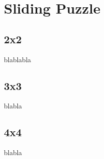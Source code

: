 
\chapter{Sliding Puzzle} %

\label{Chapter4} %


\section{2x2}

blablabla

\section{3x3}

blabla


\section{4x4}

blabla
